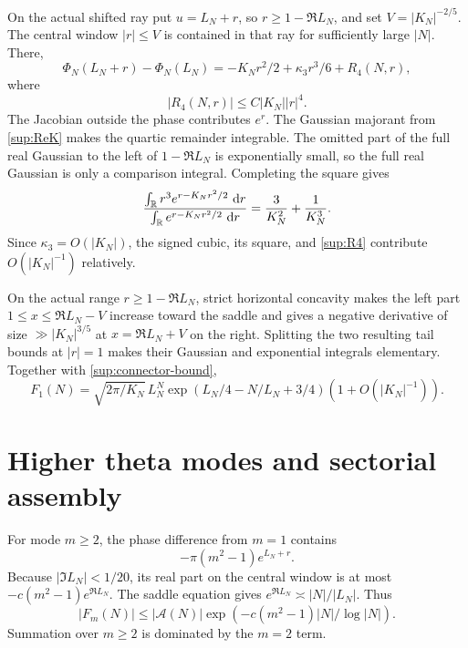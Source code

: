 \documentclass[10pt]{article}
\begin{document}
On the actual shifted ray put $u=L_N+r$, so $r\ge1-\Re L_N$, and set
$V=|K_N|^{-2/5}$.  The central window $|r|\le V$ is contained in that ray
for sufficiently large $|N|$.  There,
\begin{equation}\label{sup:central-expansion}
 \Phi_N(L_N+r)-\Phi_N(L_N)
 =-K_Nr^2/2+\kappa_3r^3/6+R_4(N,r),
\end{equation}
where
\begin{equation}\label{sup:R4}
 |R_4(N,r)|\le C|K_N||r|^4.
\end{equation}
The Jacobian outside the phase contributes $e^r$.  The Gaussian majorant from
\eqref{sup:ReK} makes the quartic remainder integrable.  The omitted part of
the full real Gaussian to the left of $1-\Re L_N$ is exponentially small, so
the full real Gaussian is only a comparison integral.  Completing the square
gives
\[
 \frac{\int_{\mathbb R}r^3e^{r-K_Nr^2/2}\,\,\mathrm d r}
 {\int_{\mathbb R}e^{r-K_Nr^2/2}\,\,\mathrm d r}
 =\frac3{K_N^2}+\frac1{K_N^3}.
\]
Since $\kappa_3=O(|K_N|)$, the signed cubic, its square, and
\eqref{sup:R4} contribute $O(|K_N|^{-1})$ relatively.

On the actual range $r\ge1-\Re L_N$, strict horizontal concavity makes the
left part $1\le x\le\Re L_N-V$ increase toward the saddle and gives a
negative derivative of size $\gg |K_N|^{3/5}$ at $x=\Re L_N+V$ on the
right.  Splitting the two resulting tail bounds at $|r|=1$ makes their
Gaussian and exponential integrals elementary.  Together with
\eqref{sup:connector-bound},
\begin{equation}\label{sup:F1-final}
 F_1(N)=\sqrt{2\pi/K_N}\,L_N^N
 \exp(L_N/4-N/L_N+3/4)
 \left(1+O(|K_N|^{-1})\right).
\end{equation}

\section{Higher theta modes and sectorial assembly}\label{sup:modes}

For mode $m\ge2$, the phase difference from $m=1$ contains
\begin{equation}\label{sup:mode-extra}
 -\pi(m^2-1)e^{L_N+r}.
\end{equation}
Because $|\Im L_N|<1/20$, its real part on the central window is at most
$-c(m^2-1)e^{\Re L_N}$.  The saddle equation gives
$e^{\Re L_N}\asymp|N|/|L_N|$.  Thus
\begin{equation}\label{sup:mode-bound}
 |F_m(N)|\le |\mathcal A(N)|
 \exp\left(-c(m^2-1)|N|/\log|N|\right).
\end{equation}
Summation over $m\ge2$ is dominated by the $m=2$ term.
\end{document}
